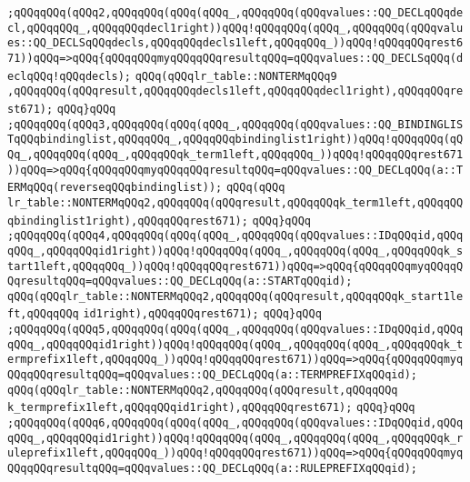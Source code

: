 \verb|;qQQqqQQq(qQQq2,qQQqqQQq(qQQq(qQQq_,qQQqqQQq(qQQqvalues::QQ_DECLqQQqdecl,qQQqqQQq_,qQQqqQQqdecl1right))qQQq!qQQqqQQq(qQQq_,qQQqqQQq(qQQqvalues::QQ_DECLSqQQqdecls,qQQqqQQqdecls1left,qQQqqQQq_))qQQq!qQQqqQQqrest671))qQQq=>qQQq{qQQqqQQqmyqQQqqQQqresultqQQq=qQQqvalues::QQ_DECLSqQQq(declqQQq!qQQqdecls);|\newline
\verb|qQQq(qQQqlr_table::NONTERMqQQq9|\newline
\verb|,qQQqqQQq(qQQqresult,qQQqqQQqdecls1left,qQQqqQQqdecl1right),qQQqqQQqrest671);|\newline
\verb|qQQq}qQQq|\newline
\verb|;qQQqqQQq(qQQq3,qQQqqQQq(qQQq(qQQq_,qQQqqQQq(qQQqvalues::QQ_BINDINGLISTqQQqbindinglist,qQQqqQQq_,qQQqqQQqbindinglist1right))qQQq!qQQqqQQq(qQQq_,qQQqqQQq(qQQq_,qQQqqQQqk_term1left,qQQqqQQq_))qQQq!qQQqqQQqrest671))qQQq=>qQQq{qQQqqQQqmyqQQqqQQqresultqQQq=qQQqvalues::QQ_DECLqQQq(a::TERMqQQq(reverseqQQqbindinglist));|\newline
\verb|qQQq(qQQq|\newline
\verb|lr_table::NONTERMqQQq2,qQQqqQQq(qQQqresult,qQQqqQQqk_term1left,qQQqqQQqbindinglist1right),qQQqqQQqrest671);|\newline
\verb|qQQq}qQQq|\newline
\verb|;qQQqqQQq(qQQq4,qQQqqQQq(qQQq(qQQq_,qQQqqQQq(qQQqvalues::IDqQQqid,qQQqqQQq_,qQQqqQQqid1right))qQQq!qQQqqQQq(qQQq_,qQQqqQQq(qQQq_,qQQqqQQqk_start1left,qQQqqQQq_))qQQq!qQQqqQQqrest671))qQQq=>qQQq{qQQqqQQqmyqQQqqQQqresultqQQq=qQQqvalues::QQ_DECLqQQq(a::STARTqQQqid);|\newline
\verb|qQQq(qQQqlr_table::NONTERMqQQq2,qQQqqQQq(qQQqresult,qQQqqQQqk_start1left,qQQqqQQq|\newline
\verb|id1right),qQQqqQQqrest671);|\newline
\verb|qQQq}qQQq|\newline
\verb|;qQQqqQQq(qQQq5,qQQqqQQq(qQQq(qQQq_,qQQqqQQq(qQQqvalues::IDqQQqid,qQQqqQQq_,qQQqqQQqid1right))qQQq!qQQqqQQq(qQQq_,qQQqqQQq(qQQq_,qQQqqQQqk_termprefix1left,qQQqqQQq_))qQQq!qQQqqQQqrest671))qQQq=>qQQq{qQQqqQQqmyqQQqqQQqresultqQQq=qQQqvalues::QQ_DECLqQQq(a::TERMPREFIXqQQqid);|\newline
\verb|qQQq(qQQqlr_table::NONTERMqQQq2,qQQqqQQq(qQQqresult,qQQqqQQq|\newline
\verb|k_termprefix1left,qQQqqQQqid1right),qQQqqQQqrest671);|\newline
\verb|qQQq}qQQq|\newline
\verb|;qQQqqQQq(qQQq6,qQQqqQQq(qQQq(qQQq_,qQQqqQQq(qQQqvalues::IDqQQqid,qQQqqQQq_,qQQqqQQqid1right))qQQq!qQQqqQQq(qQQq_,qQQqqQQq(qQQq_,qQQqqQQqk_ruleprefix1left,qQQqqQQq_))qQQq!qQQqqQQqrest671))qQQq=>qQQq{qQQqqQQqmyqQQqqQQqresultqQQq=qQQqvalues::QQ_DECLqQQq(a::RULEPREFIXqQQqid);|\newline

